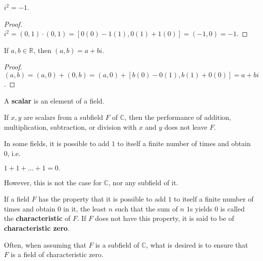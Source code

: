 \documentclass[12pt]{article}
\begin{document}
\begin{thm}
  $i^2 = -1$.

  \begin{proof}
    $i^2 = (0,1) \cdot (0,1) = [0(0) - 1(1), 0(1) + 1(0)] = (-1,0) = -1$.
  \end{proof}
\end{thm}

\begin{thm}
  If $a,b \in \mathbb{R}$, then $(a,b) = a + bi$.

  \begin{proof}
    $(a,b) = (a,0) + (0,b) = (a,0) + [b(0) - 0(1), b(1) + 0(0)] = a + bi$.
  \end{proof}
\end{thm}

\begin{defn}
  A \textbf{scalar} is an element of a field.
\end{defn}

\begin{comm}
  If $x, y$ are scalars from a subfield $F$ of $\mathbb{C}$, then
  the performance of addition, multiplication, subtraction, or
  division with $x$ and $y$ does not leave $F$.
\end{comm}

\begin{comm}
  In some fields, it is possible to add $1$ to itself a finite
  number of times and obtain $0$, i.e.
  \begin{center}
    $1 + 1 + … + 1 = 0.$
  \end{center}
  However, this is not the case for $\mathbb{C}$, nor any
  subfield of it.
\end{comm}

\begin{defn}
  If a field $F$ has the property that it is possible to add $1$
  to itself a finite number of times and obtain $0$ in it, the
  least $n$ such that the sum of $n$ $1$s yields $0$ is called
  the \textbf{characteristic} of $F$. If $F$ does not have this
  property, it is said to be of \textbf{characteristic zero}.
\end{defn}

\begin{comm}
  Often, when assuming that $F$ is a subfield of $\mathbb{C}$,
  what is desired is to ensure that $F$ is a field of
  characteristic zero.
\end{comm}
\end{document}
